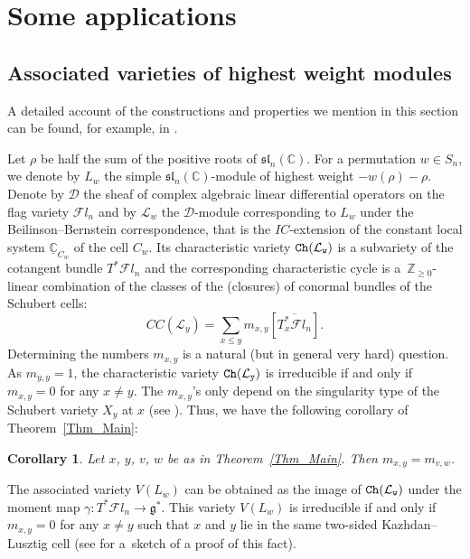 \documentclass[10pt,a4paper]{amsart}
\numberwithin{equation}{section}
\newtheorem{Corollary}[Theorem]{Corollary}
\begin{document}
\section{Some applications} \label{Sec_Applications}

\subsection{Associated varieties of highest weight modules}\label{Sec_BBJ} A detailed account of the constructions and properties we mention in this section can be found, for example, in \cite[Section~1]{tanisaki}.

Let $\rho$ be half the sum of the positive roots of $\mathfrak{sl}_n(\mathbb{C})$. For a permutation $w\in S_n$, we denote by $L_w$ the simple $\mathfrak{sl}_n(\mathbb{C})$-module of highest weight $-w(\rho)-\rho$. Denote by $\mathcal{D}$ the sheaf of complex algebraic linear differential operators on the flag variety $\mathcal{F}l_n$ and by $\mathcal{L}_w$ the $\mathcal{D}$-module corresponding to $L_w$ under the Beilinson--Bernstein correspondence, that is the $IC$-extension of the constant local system $\underline{\mathbb{C}}_{C_w}$ of the cell $C_w$. Its characteristic variety $\tt{Ch}(\mathcal{L}_w)$ is a subvariety of the cotangent bundle $T^*\mathcal{F}l_n$ and the corresponding characteristic cycle is a~$\mathbb{Z}_{\geq 0}$-linear combination of the classes of the (closures) of conormal bundles of the Schubert cells:
\[
CC(\mathcal{L}_y)=\sum_{x\leq y}m_{x,y}[\overline{T^*_x\mathcal{F}l_n}].
\]
Determining the numbers $m_{x,y}$ is a natural (but in general very hard) question. As $m_{y,y}=1$, the characteristic variety $\tt{Ch}(\mathcal{L}_y)$ is irreducible if and only if $m_{x,y}=0$ for any $x\neq y$.
The $m_{x,y}$'s only depend on the singularity type of the Schubert variety $X_y$ at $x$ (see \cite[Section~3.2]{vilonenwilliamson}). Thus, we have the following corollary of Theorem~\ref{Thm_Main}:
\begin{Corollary}\label{Cor:BBJ}
Let $x$, $y$, $v$, $w$ be as in Theorem~{\rm \ref{Thm_Main}}. Then $m_{x,y}=m_{v,w}$.
\end{Corollary}

The associated variety $V(L_w)$ can be obtained as the image of $\tt{Ch}(\mathcal{L}_w)$ under the moment map $\gamma\colon T^*\mathcal{F}l_n\rightarrow \mathfrak{g}^*$. This variety $V(L_w)$ is irreducible if and only if $m_{x,y}=0$ for any $x\neq y$ such that $x$ and $y$ lie in the same two-sided Kazhdan--Lusztig cell (see \cite[Introduction]{williamson} for a~sketch of a proof of this fact).
\end{document}
